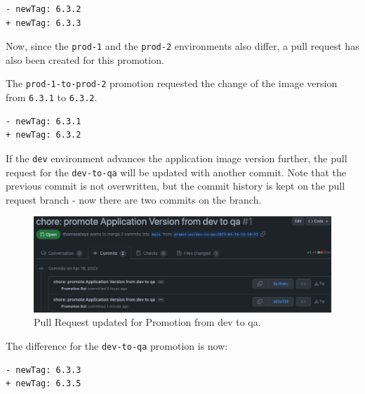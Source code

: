 \begin{lstlisting}
- newTag: 6.3.2
+ newTag: 6.3.3
\end{lstlisting}

Now, since the \lstinline|prod-1| and the \lstinline|prod-2| environments
also differ,
a pull request has also been created for this promotion.


The \lstinline|prod-1-to-prod-2| promotion requested the change of the image version from
\lstinline|6.3.1| to \lstinline|6.3.2|.

\begin{lstlisting}
- newTag: 6.3.1
+ newTag: 6.3.2
\end{lstlisting}

If the \lstinline|dev| environment advances the application image version further,
the pull request for the \lstinline|dev-to-qa| will be updated with another commit.
Note that the previous commit is not overwritten, 
but the commit history is kept on the pull request branch - now there are two commits on the branch.

\begin{figure}[h]
	\centering
	\includegraphics[width=1.00\linewidth]{assets/prom-pr-dev-to-qa-round2.png}
	\caption{Pull Request updated for Promotion from dev to qa.
	}
	\label{fig:prom-pr-dev-to-qa-round2}	
\end{figure}

The difference for the \lstinline|dev-to-qa| promotion is now:

\begin{lstlisting}
- newTag: 6.3.3
+ newTag: 6.3.5
\end{lstlisting}


